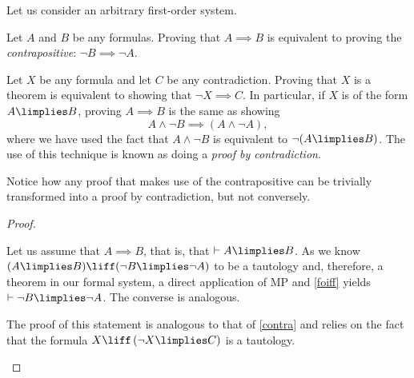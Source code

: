 \begin{theorem}
Let us consider an arbitrary first-order system.
\begin{statements}
\item Let $A$ and $B$ be any formulas. Proving that $A\implies B$ is equivalent to proving the \emph{contrapositive}: $\lnot B \implies \lnot A$. \label{contra}
\item Let $X$ be any formula and let $C$ be any contradiction.
Proving that $X$ is a theorem is equivalent to showing that $\lnot X \implies C$. In particular, if $X$ is of the form $A \limplies B$, proving $A \implies B$ is the same as showing
\[A \land \lnot B \implies (A \land \lnot A),\]
where we have used the fact that $A \land \lnot B$ is equivalent to $\lnot(A \limplies B)$. The use of this technique is known as doing a \emph{proof by contradiction}.
\end{statements}
Notice how any proof that makes use of the contrapositive can be trivially transformed into a proof by contradiction, but not conversely.
\label{pftch}
\end{theorem}

\begin{proof}
\begin{parlist}
\item Let us assume that $A \implies B$, that is, that $\vdash A \limplies B$.
As we know $(A\limplies B) \liff (\lnot B \limplies \lnot A)$ to be a tautology and, therefore, a theorem in our formal system, a direct application of MP and \ref{foiff} yields $\vdash \lnot B \limplies \lnot A$. The converse is analogous.

\item The proof of this statement is analogous to that of \ref{contra} and relies on the fact that the formula
$ X \liff \left( \lnot X \limplies C \right)$
is a tautology.
\end{parlist}
\end{proof}

